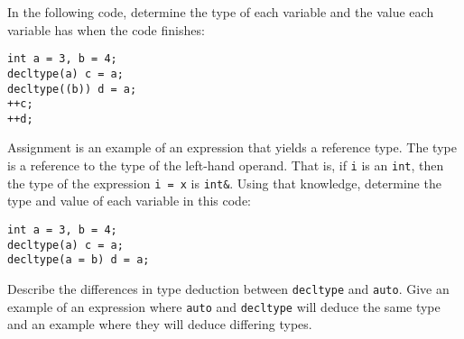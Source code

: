 %
%
\begin{question}
In the following code, determine the type of each variable
and the value each variable has when the code finishes:
\begin{lstlisting}
int a = 3, b = 4;
decltype(a) c = a;
decltype((b)) d = a;
++c;
++d;
\end{lstlisting}
\end{question}

\begin{question}
Assignment is an example of an expression that yields a
reference type. The type is a reference to the type of the left-hand operand.
That is, if \verb|i| is an \verb|int|, then the type of the expression \verb|i = x| is \verb|int&|. Using
that knowledge, determine the type and value of each variable in this code:
\begin{lstlisting}
int a = 3, b = 4;
decltype(a) c = a;
decltype(a = b) d = a;
\end{lstlisting}
\end{question}

\begin{question}
Describe the differences in type deduction between
\verb|decltype| and \verb|auto|. Give an example of an expression where \verb|auto| and
\verb|decltype| will deduce the same type and an example where they will deduce
differing types.
\end{question}
